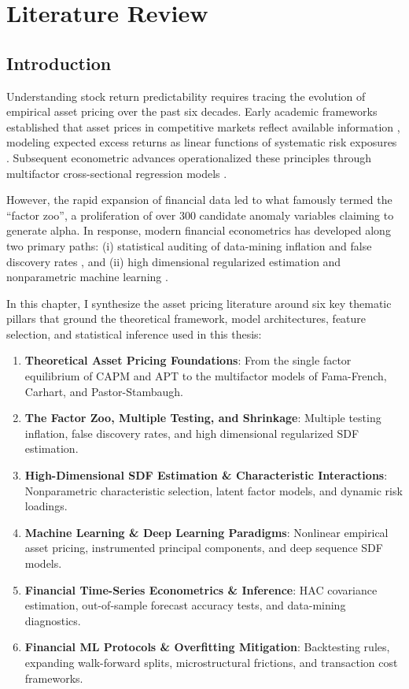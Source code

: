 \chapter{Literature Review}
\label{ch:literature_review}

\section{Introduction}
Understanding stock return predictability requires tracing the evolution of empirical asset pricing over the past six decades. Early academic frameworks established that asset prices in competitive markets reflect available information \citep{fama1970efficient}, modeling expected excess returns as linear functions of systematic risk exposures \citep{sharpe1964capital, lintner1965valuation}. Subsequent econometric advances operationalized these principles through multifactor cross-sectional regression models \citep{fama1973risk, ross1976arbitrage, fama1993common, fama2015five}.

However, the rapid expansion of financial data led to what \citet{cochrane2011discount} famously termed the ``factor zoo'', a proliferation of over 300 candidate anomaly variables claiming to generate alpha. In response, modern financial econometrics has developed along two primary paths: (i) statistical auditing of data-mining inflation and false discovery rates \citep{harvey2016and, harvey2020false, hou2020replicating}, and (ii) high dimensional regularized estimation and nonparametric machine learning \citep{kozak2020shrinking, freyberger2020dissecting, gu2020empirical, chen2023deep}.

In this chapter, I synthesize the asset pricing literature around six key thematic pillars that ground the theoretical framework, model architectures, feature selection, and statistical inference used in this thesis:
\begin{enumerate}
    \item \textbf{Theoretical Asset Pricing Foundations}: From the single factor equilibrium of CAPM and APT to the multifactor models of Fama-French, Carhart, and Pastor-Stambaugh.
    \item \textbf{The Factor Zoo, Multiple Testing, and Shrinkage}: Multiple testing inflation, false discovery rates, and high dimensional regularized SDF estimation.
    \item \textbf{High-Dimensional SDF Estimation \& Characteristic Interactions}: Nonparametric characteristic selection, latent factor models, and dynamic risk loadings.
    \item \textbf{Machine Learning \& Deep Learning Paradigms}: Nonlinear empirical asset pricing, instrumented principal components, and deep sequence SDF models.
    \item \textbf{Financial Time-Series Econometrics \& Inference}: HAC covariance estimation, out-of-sample forecast accuracy tests, and data-mining diagnostics.
    \item \textbf{Financial ML Protocols \& Overfitting Mitigation}: Backtesting rules, expanding walk-forward splits, microstructural frictions, and transaction cost frameworks.
\end{enumerate}

